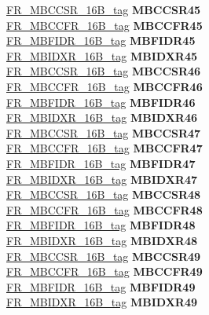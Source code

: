 \begin{DoxyCompactItemize}
\begin{tabbing}
\>\>\mbox{\hyperlink{unionFR__MBCCSR__16B__tag}{FR\_MBCCSR\_16B\_tag}} {\bfseries MBCCSR45}\\
\>\>\mbox{\hyperlink{unionFR__MBCCFR__16B__tag}{FR\_MBCCFR\_16B\_tag}} {\bfseries MBCCFR45}\\
\>\>\mbox{\hyperlink{unionFR__MBFIDR__16B__tag}{FR\_MBFIDR\_16B\_tag}} {\bfseries MBFIDR45}\\
\>\>\mbox{\hyperlink{unionFR__MBIDXR__16B__tag}{FR\_MBIDXR\_16B\_tag}} {\bfseries MBIDXR45}\\
\>\>\mbox{\hyperlink{unionFR__MBCCSR__16B__tag}{FR\_MBCCSR\_16B\_tag}} {\bfseries MBCCSR46}\\
\>\>\mbox{\hyperlink{unionFR__MBCCFR__16B__tag}{FR\_MBCCFR\_16B\_tag}} {\bfseries MBCCFR46}\\
\>\>\mbox{\hyperlink{unionFR__MBFIDR__16B__tag}{FR\_MBFIDR\_16B\_tag}} {\bfseries MBFIDR46}\\
\>\>\mbox{\hyperlink{unionFR__MBIDXR__16B__tag}{FR\_MBIDXR\_16B\_tag}} {\bfseries MBIDXR46}\\
\>\>\mbox{\hyperlink{unionFR__MBCCSR__16B__tag}{FR\_MBCCSR\_16B\_tag}} {\bfseries MBCCSR47}\\
\>\>\mbox{\hyperlink{unionFR__MBCCFR__16B__tag}{FR\_MBCCFR\_16B\_tag}} {\bfseries MBCCFR47}\\
\>\>\mbox{\hyperlink{unionFR__MBFIDR__16B__tag}{FR\_MBFIDR\_16B\_tag}} {\bfseries MBFIDR47}\\
\>\>\mbox{\hyperlink{unionFR__MBIDXR__16B__tag}{FR\_MBIDXR\_16B\_tag}} {\bfseries MBIDXR47}\\
\>\>\mbox{\hyperlink{unionFR__MBCCSR__16B__tag}{FR\_MBCCSR\_16B\_tag}} {\bfseries MBCCSR48}\\
\>\>\mbox{\hyperlink{unionFR__MBCCFR__16B__tag}{FR\_MBCCFR\_16B\_tag}} {\bfseries MBCCFR48}\\
\>\>\mbox{\hyperlink{unionFR__MBFIDR__16B__tag}{FR\_MBFIDR\_16B\_tag}} {\bfseries MBFIDR48}\\
\>\>\mbox{\hyperlink{unionFR__MBIDXR__16B__tag}{FR\_MBIDXR\_16B\_tag}} {\bfseries MBIDXR48}\\
\>\>\mbox{\hyperlink{unionFR__MBCCSR__16B__tag}{FR\_MBCCSR\_16B\_tag}} {\bfseries MBCCSR49}\\
\>\>\mbox{\hyperlink{unionFR__MBCCFR__16B__tag}{FR\_MBCCFR\_16B\_tag}} {\bfseries MBCCFR49}\\
\>\>\mbox{\hyperlink{unionFR__MBFIDR__16B__tag}{FR\_MBFIDR\_16B\_tag}} {\bfseries MBFIDR49}\\
\>\>\mbox{\hyperlink{unionFR__MBIDXR__16B__tag}{FR\_MBIDXR\_16B\_tag}} {\bfseries MBIDXR49}\\

\end{tabbing}
\end{DoxyCompactItemize}
